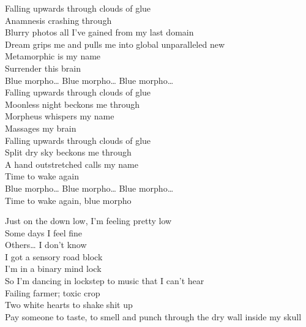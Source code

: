 


Falling upwards through clouds of glue \\
Anamnesis crashing through \\
Blurry photos all I've gained from my last domain \\

Dream grips me and pulls me into global unparalleled new \\
Metamorphic is my name \\
Surrender this brain \\

Blue morpho… Blue morpho… Blue morpho… \\

Falling upwards through clouds of glue \\
Moonless night beckons me through \\
Morpheus whispers my name \\
Massages my brain \\

Falling upwards through clouds of glue \\
Split dry sky beckons me through \\
A hand outstretched calls my name \\
Time to wake again \\

Blue morpho… Blue morpho… Blue morpho… \\

Time to wake again, blue morpho \\




Just on the down low, I'm feeling pretty low \\
Some days I feel fine \\
Others… I don't know \\
I got a sensory road block \\
I'm in a binary mind lock \\
So I'm dancing in lockstep to music that I can't hear \\

Failing farmer; toxic crop \\
Two white hearts to shake shit up \\
Pay someone to taste, to smell and punch through the dry wall inside my skull \\

